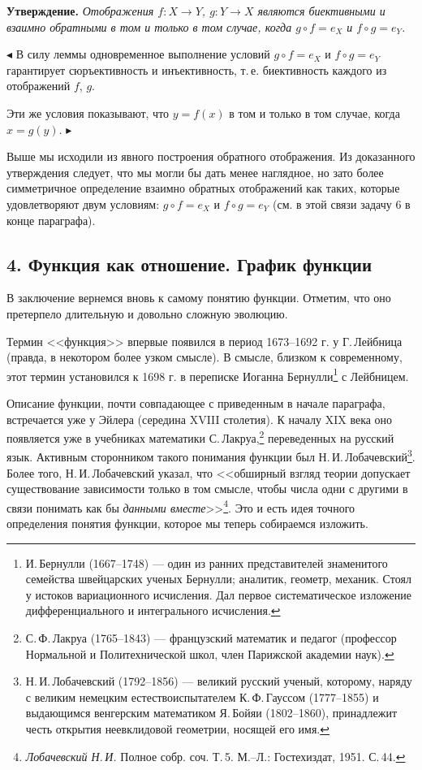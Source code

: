\textbf{Утверждение.} \textit{Отображения $f \colon X \to Y$, $g \colon Y \to X$ являются биективными и взаимно обратными в том и только в том случае, когда $g \circ f = e_X$ и
$f \circ g = e_Y$.}

$\blacktriangleleft$ В силу леммы одновременное выполнение условий $g \circ f = e_X$ и $f \circ g = e_Y$
гарантирует сюръективность и инъективность, т.\,е. биективность каждого
из отображений $f$, $g$.

Эти же условия показывают, что $y = f(x)$ в том и только в том случае,
когда $x = g(y)$. $\blacktriangleright$

Выше мы исходили из явного построения обратного отображения. Из доказанного утверждения следует, что мы могли бы дать менее наглядное, но
зато более симметричное определение взаимно обратных отображений как
таких, которые удовлетворяют двум условиям: $g \circ f = e_X$ и $f \circ g = e_Y$ (см. в
этой связи задачу 6 в конце параграфа).

\subsection*{4. Функция как отношение. График функции}

В заключение вернемся
вновь к самому понятию функции. Отметим, что оно претерпело длительную и довольно сложную эволюцию.

Термин <<функция>> впервые появился в период 1673--1692 г. у Г.\,Лейбница (правда, в некотором более узком смысле). В смысле, близком к современному, этот термин установился к 1698 г. в переписке Иоганна Бернулли\footnote{И.\,Бернулли (1667--1748) --- один из ранних представителей знаменитого семейства
швейцарских ученых Бернулли; аналитик, геометр, механик. Стоял у истоков вариационного исчисления. Дал первое систематическое изложение дифференциального и интегрального исчисления.} с
Лейбницем.

Описание функции, почти совпадающее с приведенным в начале параграфа, встречается уже у Эйлера (середина XVIII столетия). К началу XIX
века оно появляется уже в учебниках математики С.\,Лакруа,\footnote{С.\,Ф.\,Лакруа (1765--1843) --- французский математик и педагог (профессор Нормальной и Политехнической школ, член Парижской академии наук).} переведенных
на русский язык. Активным сторонником такого понимания функции был
Н.\,И.\,Лобачевский\footnote{Н.\,И.\,Лобачевский (1792--1856) --- великий русский ученый, которому, наряду с великим немецким естествоиспытателем К.\,Ф.\,Гауссом (1777--1855) и выдающимся венгерским математиком Я.\,Бойяи (1802--1860), принадлежит честь открытия неевклидовой
геометрии, носящей его имя.}. Более того, Н.\,И.\,Лобачевский указал, что <<обширный
взгляд теории допускает существование зависимости только в том смысле,
чтобы числа одни с другими в связи понимать как бы \textit{данными вместе}>>\footnote{\textit{Лобачевский Н.\,И.} Полное собр. соч. Т.\,5. М.--Л.: Гостехиздат, 1951. С.\,44.}.
Это и есть идея точного определения понятия функции, которое мы теперь
собираемся изложить.

